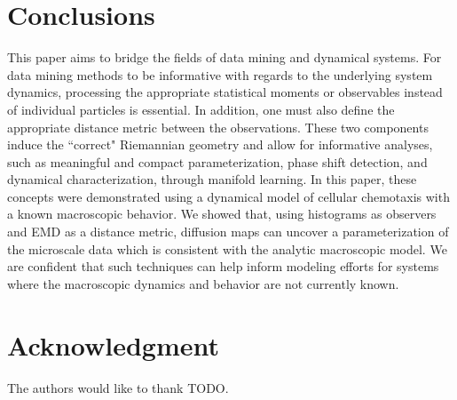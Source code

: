 \documentclass[preprint]{elsarticle}
\begin{document}
\section{Conclusions}

This paper aims to bridge the fields of data mining and dynamical systems. 
%
For data mining methods to be informative with regards to the underlying system dynamics, processing the appropriate statistical moments or observables instead of individual particles is essential. 
%
In addition, one must also define the appropriate distance metric between the observations.
%
These two components induce the ``correct" Riemannian geometry and allow for informative analyses, such as meaningful and compact parameterization, phase shift detection, and dynamical characterization, through manifold learning.
%
In this paper, these concepts were demonstrated using a dynamical model of cellular chemotaxis with a known macroscopic behavior.
%
We showed that, using histograms as observers and EMD as a distance metric, diffusion maps can uncover a parameterization of the microscale data which is consistent with the analytic macroscopic model.
%
We are confident that such techniques can help inform modeling efforts for systems where the macroscopic dynamics and behavior are not currently known. 


\section*{Acknowledgment}
The authors would like to thank TODO.



\end{document}
